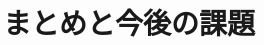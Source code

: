 \documentclass{deimj}
\begin{document}






\section{まとめと今後の課題}
\label{sec:まとめと今後の課題}
\end{document}
